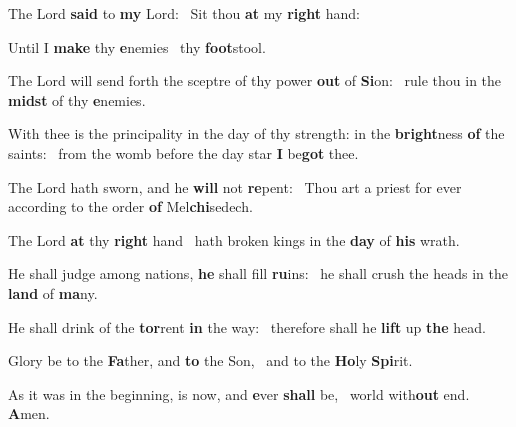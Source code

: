 \documentclass[12pt]{book} %
\newenvironment{psalmtext}{\leftskip 0.25in}{\vspace{2 mm}}
\let\oldgresixstar\gresixstar
\renewcommand{\gresixstar}{\textcolor{benred8}{\oldgresixstar}}
\begin{document}


\begin{psalmtext}
The Lord \textbf{said} to \textbf{my} Lord: \gresixstar\ Sit thou \textbf{at} my \textbf{right} hand:

Until I \textbf{make} thy \textbf{e}nemies \gresixstar\ thy \textbf{foot}stool.

The Lord will send forth the sceptre of thy power \textbf{out} of \textbf{Si}on: \gresixstar\ rule thou in the \textbf{midst} of thy \textbf{e}nemies.

With thee is the principality in the day of thy strength: in the \textbf{bright}ness \textbf{of} the saints: \gresixstar\ from the womb before the day star \textbf{I} be\textbf{got} thee.

The Lord hath sworn, and he \textbf{will} not \textbf{re}pent: \gresixstar\ Thou art a priest for ever according to the order \textbf{of} Mel\textbf{chi}sedech.

The Lord \textbf{at} thy \textbf{right} hand \gresixstar\ hath broken kings in the \textbf{day} of \textbf{his} wrath.

He shall judge among nations, \textbf{he} shall fill \textbf{ru}ins: \gresixstar\ he shall crush the heads in the \textbf{land} of \textbf{ma}ny.

He shall drink of the \textbf{tor}rent \textbf{in} the way: \gresixstar\ therefore shall he \textbf{lift} up \textbf{the} head.

Glory be to the \textbf{Fa}ther, and \textbf{to} the Son, \gresixstar\ and to the \textbf{Ho}ly \textbf{Spi}rit.

As it was in the beginning, is now, and \textbf{e}ver \textbf{shall} be, \gresixstar\ world with\textbf{out} end. \textbf{A}men.

\end{psalmtext}
\end{document}
